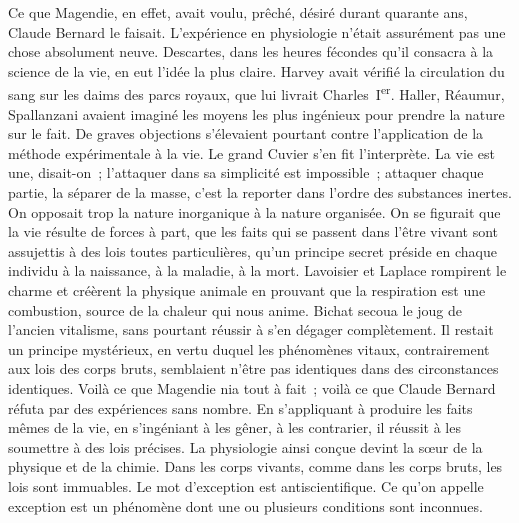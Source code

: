 \documentclass[french,twoside]{book} %
\newcommand\persName[1]{#1}
\begin{document}
Ce que {\persName Magendie}, en effet, avait voulu, prêché, désiré durant quarante ans, {\persName Claude Bernard} le faisait. L’expérience en physiologie n’était assurément pas une chose absolument neuve. {\persName Descartes}, dans les heures fécondes qu’il consacra à la science de la vie, en eut l’idée la plus claire. {\persName Harvey} avait vérifié la circulation du sang sur les daims des parcs royaux, que lui livrait {\persName Charles I\textsuperscript{er}}. {\persName Haller}, {\persName Réaumur}, {\persName Spallanzani} avaient imaginé les moyens les plus ingénieux pour prendre la nature sur le fait. De graves objections s’élevaient pourtant contre l’application de la méthode expérimentale à la vie. Le grand {\persName Cuvier} s’en fit l’interprète. La vie est une, disait-on ; l’attaquer dans sa simplicité est impossible ; attaquer chaque partie, la séparer de la masse, c’est la reporter dans l’ordre des substances inertes. On opposait trop la nature inorganique à la nature organisée. On se figurait que la vie résulte de forces à part, que les faits qui se passent dans l’être vivant sont assujettis à des lois toutes particulières, qu’un principe secret préside en chaque individu à la naissance, à la maladie, à la mort. {\persName Lavoisier} et {\persName Laplace} rompirent le charme et créèrent la physique animale en prouvant que la respiration est une combustion, source de la chaleur qui nous anime. {\persName Bichat} secoua le joug de l’ancien vitalisme, sans pourtant réussir à s’en dégager complètement. Il restait un principe mystérieux, en vertu duquel les phénomènes vitaux, contrairement aux lois des corps bruts, semblaient n’être pas identiques dans des circonstances identiques. Voilà ce que {\persName Magendie} nia tout à fait ; voilà ce que {\persName Claude Bernard} réfuta par des expériences sans nombre. En s’appliquant à produire les faits mêmes de la vie, en s’ingéniant à les gêner, à les contrarier, il réussit à les soumettre à des lois précises. La physiologie ainsi conçue devint la sœur de la physique et de la chimie. Dans les corps vivants, comme dans les corps bruts, les lois sont immuables. Le mot d’exception est antiscientifique. Ce qu’on appelle exception est un phénomène dont une ou plusieurs conditions sont inconnues.\par
\end{document}
